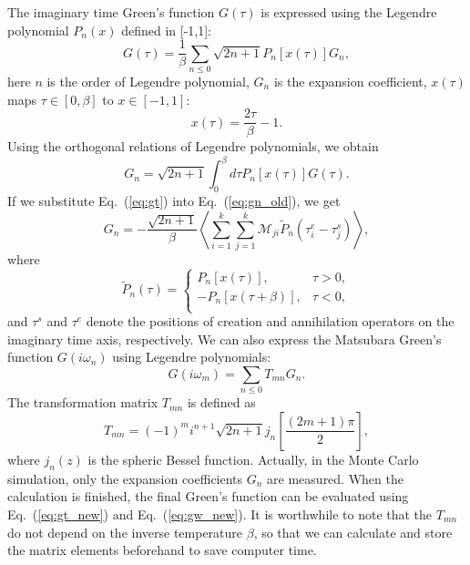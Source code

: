 The imaginary time Green's function $G(\tau)$ is expressed using the Legendre polynomial $P_n(x)$ defined in [-1,1]:
\begin{equation}
\label{eq:gt_new}
G(\tau) = \frac{1}{\beta} \sum_{n \leq 0} \sqrt{2n + 1} P_{n}[x(\tau)] G_n,
\end{equation}
here $n$ is the order of Legendre polynomial, $G_{n}$ is the expansion coefficient, $x(\tau)$
maps $\tau \in [0,\beta]$ to $x \in [-1,1]$:
\begin{equation}
x(\tau) = \frac{2\tau}{\beta} - 1.
\end{equation}
Using the orthogonal relations of Legendre polynomials, we obtain 
\begin{equation}
\label{eq:gn_old}
G_n = \sqrt{2n + 1} \int^{\beta}_{0} d\tau P_{n}[x(\tau)] G(\tau).
\end{equation}
If we substitute Eq.~(\ref{eq:gt}) into Eq.~(\ref{eq:gn_old}), we get 
\begin{equation}
G_n = -\frac{\sqrt{2n + 1}}{\beta} \left\langle \sum^{k}_{i=1} \sum^{k}_{j=1}
\mathcal{M}_{ji} \tilde{P}_{n}(\tau^e_i - \tau^s_j) \right\rangle,
\end{equation}
where
\begin{equation}
\tilde{P}_n(\tau) = 
\begin{cases}
P_n [x(\tau)], & \tau > 0, \\
-P_n [x(\tau + \beta)], & \tau < 0, \\
\end{cases}
\end{equation}
and $\tau^{s}$ and $\tau^{e}$ denote the positions of creation and annihilation operators on the imaginary time axis, respectively. We can also express the Matsubara Green's function $G(i\omega_n)$ using Legendre polynomials:
\begin{equation}
\label{eq:gw_new}
G(i\omega_m) = \sum_{n \leq 0} T_{mn} G_n.
\end{equation}
The transformation matrix $T_{mn}$ is defined as
\begin{equation}
T_{mn} = (-1)^m i^{n+1} \sqrt{2n + 1} j_n \left[\frac{(2m + 1)\pi}{2}\right],
\end{equation}
where $j_n(z)$ is the spheric Bessel function. Actually, in the Monte Carlo simulation, only the expansion coefficients $G_n$ are measured. When the calculation is finished, the final Green's function can be evaluated using Eq.~(\ref{eq:gt_new}) and Eq.~(\ref{eq:gw_new}). It is worthwhile to note that the $T_{mn}$ do not depend on the inverse temperature $\beta$, so that we can calculate and store the matrix elements beforehand to save computer time.

